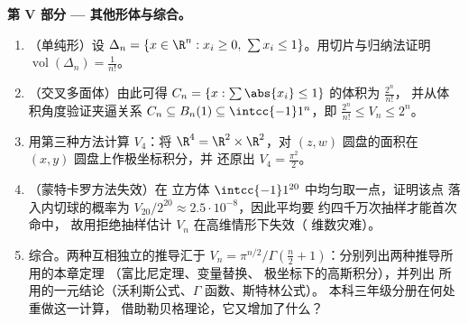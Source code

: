 \begin{problem}[{周末问题 --- $V_n =
\pi^{n/2}/\Gamma(\frac n2 + 1)$，以及高维的
奇异现象}]
\medskip
\noindent\textbf{第 V 部分 --- 其他形体与综合。}
\begin{enumerate}[resume]
  \item （单纯形）设 $\Delta_n = \{x \in \R^n : x_i \geq 0,\
        \sum x_i \leq 1\}$。用切片与归纳法证明
        $\operatorname{vol}(\Delta_n) = \frac1{n!}$。
  \item （交叉多面体）由此可得 $C_n = \{x :
        \sum\abs{x_i} \leq 1\}$ 的体积为 $\frac{2^n}{n!}$，
        并从体积角度验证夹逼关系 $C_n \subseteq B_n(1)
        \subseteq \intcc{-1}1^n$，即
        $\frac{2^n}{n!} \leq V_n \leq 2^n$。
  \item 用第三种方法计算 $V_4$：将 $\R^4 = \R^2 \times
        \R^2$，对 $(z, w)$ 圆盘的面积在
        $(x, y)$ 圆盘上作极坐标积分，并
        还原出 $V_4 = \frac{\pi^2}2$。
  \item （蒙特卡罗方法失效）在
        立方体 $\intcc{-1}1^{20}$ 中均匀取一点，证明该点
        落入内切球的概率为
        $V_{20}/2^{20} \approx 2.5\cdot10^{-8}$，因此平均要
        约四千万次抽样才能首次命中，
        故用拒绝抽样估计 $V_n$
        在高维情形下失效（
        维数灾难）。
  \item 综合。两种互相独立的推导汇于 $V_n =
        \pi^{n/2}/\Gamma(\frac n2 + 1)$：分别列出两种推导所用的本章定理
        （富比尼定理、变量替换、
        极坐标下的高斯积分），并列出
        所用的一元结论（沃利斯公式、$\Gamma$ 函数、斯特林公式）。
        本科三年级分册在何处重做这一计算，
        借助勒贝格理论，它又增加了什么？
\end{enumerate}
\end{problem}
